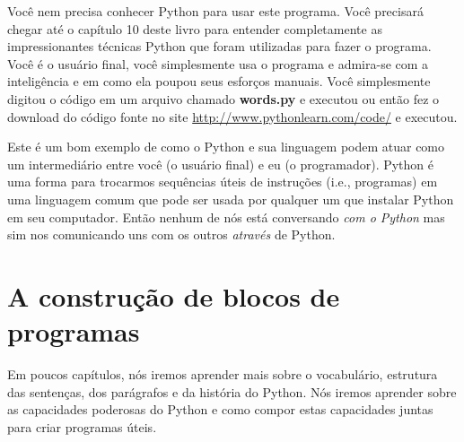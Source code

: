 Você nem precisa conhecer Python para usar este programa. Você precisará chegar até o
capítulo 10 deste livro para entender completamente as impressionantes técnicas Python
que foram utilizadas para fazer o programa. Você é o usuário final, você simplesmente usa
o programa e admira-se com a inteligência e em como ela poupou seus esforços manuais.
Você simplesmente digitou o código em um arquivo chamado {\bf words.py} e executou ou então
fez o download do código fonte no site \url{http://www.pythonlearn.com/code/} e executou.
%


Este é um bom exemplo de como o Python e sua linguagem podem atuar como um intermediário
entre você (o usuário final) e eu (o programador). Python é uma forma para trocarmos
sequências úteis de instruções (i.e., programas) em uma linguagem comum que pode ser usada por
qualquer um que instalar Python em seu computador. Então nenhum de nós está conversando {\em com o Python}
mas sim nos comunicando uns com os outros {\em através} de Python.
%

\section{A construção de blocos de programas}
%

Em poucos capítulos, nós iremos aprender mais sobre o vocabulário, estrutura das sentenças,
dos parágrafos e da história do Python. Nós iremos aprender sobre as capacidades poderosas
do Python e como compor estas capacidades juntas para criar programas úteis.
%

